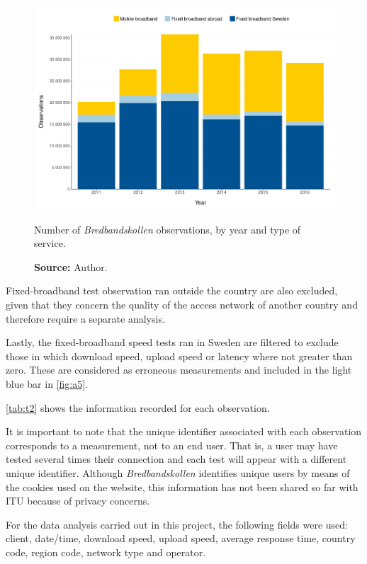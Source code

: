 \documentclass[12pt]{article}
\begin{document}
\begin{figure}[H]
    \centering
        \includegraphics[width=\linewidth]{Observations_year.pdf}
        \caption{Number of \textit{Bredbandskollen} observations, by year and type of service.}
        \caption*{\textbf{Source:} Author.}
        \label{fig:a5}
\end{figure}   

Fixed-broadband test observation ran outside the country are also excluded, given that they concern the quality of the access network of another country and therefore require a separate analysis. 

Lastly, the fixed-broadband speed tests ran in Sweden are filtered to exclude those in which download speed, upload speed or latency where not greater than zero. These are considered as erroneous measurements and included in the light blue bar in \autoref{fig:a5}.           

\autoref{tab:t2} shows the information recorded for each observation. 
 
It is important to note that the unique identifier associated with each observation corresponds to a measurement, not to an end user. That is, a user may have tested several times their connection and each test will appear with a different unique identifier. Although \textit{Bredbandskollen} identifies unique users by means of the cookies used on the website, this information has not been shared so far with ITU because of privacy concerns.

For the data analysis carried out in this project, the following fields were used: client, date/time, download speed, upload speed, average response time, country code, region code, network type and operator.
\end{document}
